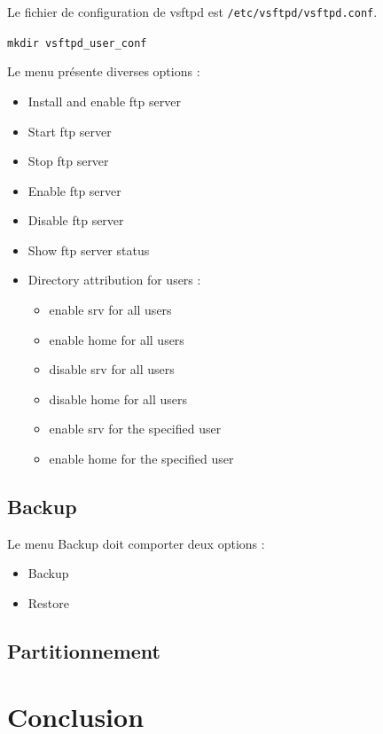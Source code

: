 \documentclass{article}
\begin{document}
	Le fichier de configuration de vsftpd est \texttt{/etc/vsftpd/vsftpd.conf}.
	
	\texttt{mkdir vsftpd_user_conf}
	
	Le menu présente diverses options :
	\begin{itemize}
		\item Install and enable ftp server
		\item Start ftp server 
		\item Stop ftp server
		\item Enable ftp server
		\item Disable ftp server 
		\item Show ftp server status
		\item Directory attribution for users :
		\begin{itemize}
			\item enable srv for all users
			\item enable home for all users
			\item  disable srv for all users
			\item disable home for all users
			\item enable srv for the specified user
			\item enable home for the specified user
		\end{itemize}
	\end{itemize}
	
	\newpage
	
	\subsection{Backup}
	Le menu Backup doit comporter deux options :
	\begin{itemize}
		\item Backup
		\item Restore
	\end{itemize}
	
	\newpage
	
	\subsection{Partitionnement}
	
	\newpage
	\section{Conclusion}
\end{document}
